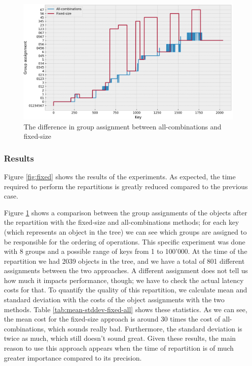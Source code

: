 \begin{figure}[!htb]
  \centering
  \includegraphics[width=\textwidth,height=\textheight,keepaspectratio]{img/partition_difference_fixed_all.png}
  \caption{The difference in group assignment between all-combinations and fixed-size}
  \label{fig:fixed-partitioning}
\end{figure}

\subsubsection{Results}
Figure \ref{fig:fixed} shows the results of the experiments. As expected, the time required to perform the repartitions is greatly reduced compared to the previous case. 

Figure \ref{fig:fixed-partitioning} shows a comparison between the group assignments of the objects after the repartition with the fixed-size and all-combinations methods; for each key (which represents an object in the tree) we can see which groups are assigned to be responsible for the ordering of operations. This specific experiment was done with 8 groups and a possible range of keys from 1 to 100'000. At the time of the repartition we had 2039 objects in the tree, and we have a total of 801 different assignments between the two approaches. A different assignment does not tell us how much it impacts performance, though; we have to check the actual latency costs for that.
To quantify the quality of this repartition, we calculate mean and standard deviation with the costs of the object assignments with the two methods. Table \ref{tab:mean-stddev-fixed-all} shows these statistics. As we can see, the mean cost for the fixed-size approach is around 30 times the cost of all-combinations, which sounds really bad. Furthermore, the standard deviation is twice as much, which still doesn't sound great. Given these results, the main reason to use this approach appears when the time of repartition is of much greater importance compared to its precision.

